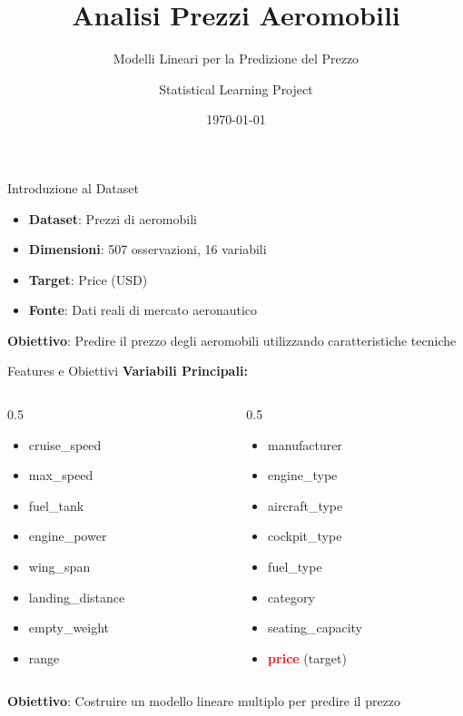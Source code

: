 \documentclass{beamer}
\title{Analisi Prezzi Aeromobili}
\subtitle{Modelli Lineari per la Predizione del Prezzo}
\author{Statistical Learning Project}
\date{\today}
\begin{document}
\frame{\titlepage}

\begin{frame}{Introduzione al Dataset}
\begin{itemize}
    \item \textbf{Dataset}: Prezzi di aeromobili
    \item \textbf{Dimensioni}: 507 osservazioni, 16 variabili
    \item \textbf{Target}: Price (USD)
    \item \textbf{Fonte}: Dati reali di mercato aeronautico
\end{itemize}

\vspace{1cm}
\begin{center}
\textbf{Obiettivo}: Predire il prezzo degli aeromobili utilizzando caratteristiche tecniche
\end{center}
\end{frame}

\begin{frame}{Features e Obiettivi}
\textbf{Variabili Principali:}
\begin{columns}
\begin{column}{0.5\textwidth}
\begin{itemize}
    \item cruise\_speed
    \item max\_speed  
    \item fuel\_tank
    \item engine\_power
    \item wing\_span
    \item landing\_distance
    \item empty\_weight
    \item range
\end{itemize}
\end{column}
\begin{column}{0.5\textwidth}
\begin{itemize}
    \item manufacturer
    \item engine\_type
    \item aircraft\_type
    \item cockpit\_type
    \item fuel\_type
    \item category
    \item seating\_capacity
    \item \textcolor{red}{\textbf{price}} (target)
\end{itemize}
\end{column}
\end{columns}

\vspace{0.5cm}
\textbf{Obiettivo}: Costruire un modello lineare multiplo per predire il prezzo
\end{frame}
\end{document}
